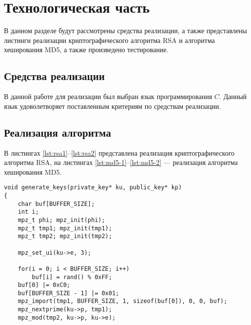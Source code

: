 \chapter{Технологическая часть}

В данном разделе будут рассмотрены средства реализации, а также представлены листинги реализации криптографического алгоритма RSA и алгоритма хеширования MD5, а также произведено тестирование.

\section{Средства реализации}
В данной работе для реализации был выбран язык программирования $C$. Данный язык удоволетворяет поставленным критериям по средствам реализации.

\section{Реализация алгоритма}

В листингах \ref{lst:rsa1}--\ref{lst:rsa2} представлена реализация криптографического алгоритма RSA, на листингах \ref{lst:md5-1}--\ref{lst:md5-2} --- реализация алгоритма хеширования MD5.

\begin{center}
    \captionsetup{justification=raggedright,singlelinecheck=off}
    \begin{lstlisting}[label=lst:rsa1,caption=Реализация алгоритма получения ключей RSA часть 1]
void generate_keys(private_key* ku, public_key* kp)
{
    char buf[BUFFER_SIZE];
    int i;
    mpz_t phi; mpz_init(phi);
    mpz_t tmp1; mpz_init(tmp1);
    mpz_t tmp2; mpz_init(tmp2);

    mpz_set_ui(ku->e, 3);

    for(i = 0; i < BUFFER_SIZE; i++)
        buf[i] = rand() % 0xFF;
    buf[0] |= 0xC0;
    buf[BUFFER_SIZE - 1] |= 0x01;
    mpz_import(tmp1, BUFFER_SIZE, 1, sizeof(buf[0]), 0, 0, buf);
    mpz_nextprime(ku->p, tmp1);
    mpz_mod(tmp2, ku->p, ku->e);
\end{lstlisting}
\end{center}


